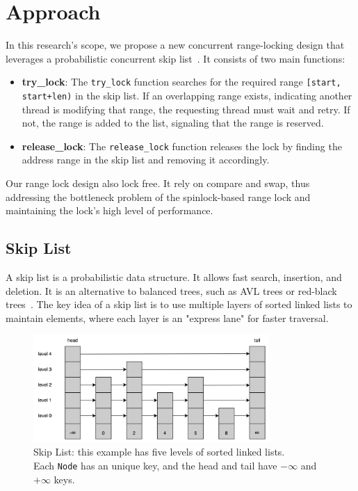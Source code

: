 
\chapter{Approach}\label{chapter:approach}

In this research's scope, we propose a new concurrent range-locking design that leverages a probabilistic concurrent skip list~\parencite{herlihy2006provably, herlihy2020art}. It consists of two main functions:
\begin{itemize}
    \item \textbf{try\_lock}: The \texttt{try\_lock} function searches for the required range \texttt{[start, start+len)} in the skip list. If an overlapping range exists, indicating another thread is modifying that range, the requesting thread must wait and retry. If not, the range is added to the list, signaling that the range is reserved.
    \item \textbf{release\_lock}: The \texttt{release\_lock} function releases the lock by finding the address range in the skip list and removing it accordingly.
\end{itemize} 

Our range lock design also lock free. It rely on compare and swap, thus addressing the bottleneck problem of the spinlock-based range lock and maintaining the lock's high level of performance. 

\section{Skip List}

A skip list is a probabilistic data structure. It allows fast search, insertion, and deletion. It is an alternative to balanced trees, such as AVL trees or red-black trees~\parencite{pugh1990skip, pugh1990skip2}. The key idea of a skip list is to use multiple layers of sorted linked lists to maintain elements, where each layer is an "express lane" for faster traversal.

\begin{figure}[h]
    \centering
    \includegraphics[width=0.8\textwidth]{./figures/skiplist.jpg}
    \caption{Skip List: this example has five levels of sorted linked lists. \\
    Each \texttt{Node} has an unique key, and the head and tail have $-\infty$ and $+\infty$ keys.}
    \label{fig:skiplist}
\end{figure}

